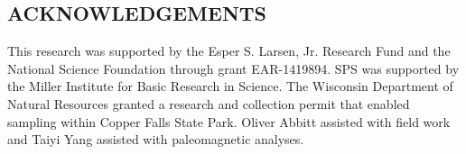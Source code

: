 \documentclass[11pt,letterpaper]{article}
\begin{document}
\subsection*{ACKNOWLEDGEMENTS}
\footnotesize

This research was supported by the Esper S. Larsen, Jr. Research Fund and the National Science Foundation through grant EAR-1419894. SPS was supported by the Miller Institute for Basic Research in Science. The Wisconsin Department of Natural Resources granted a research and collection permit that enabled sampling within Copper Falls State Park. Oliver Abbitt assisted with field work and Taiyi Yang assisted with paleomagnetic analyses. 

\singlespacing

\newpage



\end{document}

